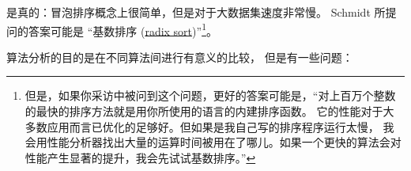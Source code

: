     


是真的：冒泡排序概念上很简单，但是对于大数据集速度非常慢。
Schmidt 所提问的答案可能是 ``基数排序 (\href{http://en.wikipedia.org/wiki/Radix_sort}{radix sort})''\footnote{但是，如果你采访中被问到这个问题，更好的答案可能是，``对上百万个整数的最快的排序方法就是用你所使用的语言的内建排序函数。 它的性能对于大多数应用而言已优化的足够好。但如果是我自己写的排序程序运行太慢， 我会用性能分析器找出大量的运算时间被用在了哪儿。如果一个更快的算法会对性能产生显著的提升，我会先试试基数排序。''}。


算法分析的目的是在不同算法间进行有意义的比较， 但是有一些问题：


